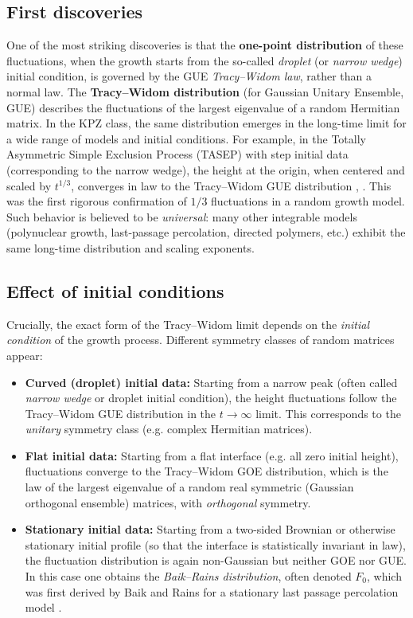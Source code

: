 \documentclass[letterpaper,11pt,oneside,reqno]{article}
\numberwithin{equation}{section}
\theoremstyle{definition}
\begin{document}
\subsection{First discoveries}

One of the most striking discoveries is that the
\textbf{one-point distribution} of these fluctuations,
when the growth starts from the so-called
\emph{droplet} (or \emph{narrow wedge}) initial condition,
is
governed by the GUE \emph{Tracy–Widom law},
rather than a normal law. The \textbf{Tracy–Widom
distribution} (for Gaussian Unitary Ensemble, GUE) describes
the fluctuations of the largest eigenvalue of a random
Hermitian matrix. In the KPZ class, the same distribution
emerges in the long-time limit for a wide range of models
and initial conditions. For example,
in the Totally Asymmetric Simple Exclusion Process
(TASEP) with step initial data (corresponding to the narrow wedge), the height at the
origin, when centered and scaled by $t^{1/3}$, converges in
law to the Tracy–Widom GUE distribution
\cite{johansson2000shape},
\cite{remenik2023integrable}.
This was the first rigorous confirmation of $1/3$
fluctuations in a random growth model.
Such behavior is believed
to be \emph{universal}: many other integrable models
(polynuclear growth, last-passage percolation, directed
polymers, etc.) exhibit the same long-time distribution and
scaling exponents.

\subsection{Effect of initial conditions}

Crucially, the exact form of the Tracy--Widom limit depends on the \emph{initial condition} of the growth process. Different symmetry classes of random matrices appear:
\begin{itemize}
		\item \textbf{Curved (droplet) initial data:} Starting
			from a narrow peak (often called \emph{narrow wedge}
			or droplet initial condition), the height fluctuations
			follow the Tracy--Widom GUE distribution in the
			$t\to\infty$ limit. This
			corresponds to the \emph{unitary} symmetry
			class (e.g. complex Hermitian matrices).

		\item \textbf{Flat initial data:} Starting from a flat
			interface (e.g. all zero initial height), fluctuations
			converge to the Tracy--Widom GOE distribution,
			which is the law of the
			largest eigenvalue of a random real symmetric (Gaussian
			orthogonal ensemble) matrices, with \emph{orthogonal} symmetry.

		\item \textbf{Stationary initial data:} Starting from a
			two-sided Brownian or otherwise stationary initial
			profile (so that the interface is statistically
			invariant in law), the fluctuation distribution is
			again non-Gaussian but neither GOE nor GUE. In this
			case one obtains the \emph{Baik--Rains distribution},
			often denoted $F_0$, which was first derived by Baik
			and Rains for a stationary last passage percolation
			model \cite{baik2000limiting_BR_distribution}.
\end{itemize}
\end{document}
